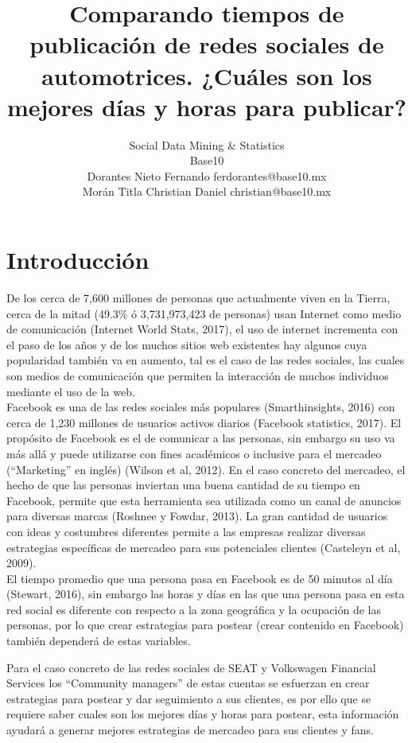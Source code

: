 \documentclass[a4paper,10pt]{article}
\title{Comparando tiempos de publicación de redes sociales de automotrices. 
¿Cuáles son los mejores días y horas para publicar?}
\author{Social Data Mining \& Statistics \\
        Base10\\
        \scriptsize Dorantes Nieto Fernando ferdorantes@base10.mx \\
        \scriptsize Morán Titla Christian Daniel christian@base10.mx}
\date{}
\begin{document}
\maketitle


\section{Introducción}
De los cerca de 7,600 millones de personas que  actualmente viven en la Tierra, cerca
de la mitad (49.3\% ó 3,731,973,423 de personas) usan Internet como medio de comunicación (Internet World Stats, 2017),
el uso de internet incrementa con el paso de los años y de los muchos sitios web existentes
hay algunos cuya popularidad también va en aumento, tal es el caso de las redes sociales,
las cuales son  medios de comunicación que permiten la interacción 
de muchos individuos mediante el uso de la web.\\

Facebook es una de las redes sociales más populares (Smarthinsights, 2016) con cerca de
1,230 millones de usuarios activos diarios (Facebook statistics, 2017).
El propósito de Facebook es el de comunicar  a las personas, sin embargo
su uso va más allá y puede utilizarse con fines académicos o inclusive para el mercadeo (``Marketing'' en inglés) (Wilson et al, 2012).
En el caso concreto del mercadeo, el hecho de que las personas inviertan una buena cantidad de su tiempo en Facebook, 
permite que esta herramienta sea utilizada como un canal de anuncios para diversas marcas (Roshnee y Fowdar, 2013).
La gran cantidad de usuarios con ideas y costumbres diferentes permite a las empresas
realizar diversas estrategias específicas de mercadeo para sus potenciales clientes 
(Casteleyn et al, 2009).\\

El tiempo promedio que una persona pasa en Facebook es de 50 minutos al día (Stewart, 2016),
sin embargo las horas y días en las que una persona pasa en esta red social es diferente
con respecto a la zona geográfica y la ocupación de las personas, por lo que crear estrategias 
para postear (crear contenido en Facebook) también dependerá de estas variables.



Para el caso concreto de las redes sociales de SEAT y Volkswagen Financial Services
los ``Community managers'' de estas cuentas se esfuerzan en crear estrategias para postear y dar seguimiento a sus clientes,
es por ello que se requiere saber cuales son los mejores días y horas para postear, esta información ayudará a generar mejores estrategias
de mercadeo para sus clientes y fans.\\
\end{document}
